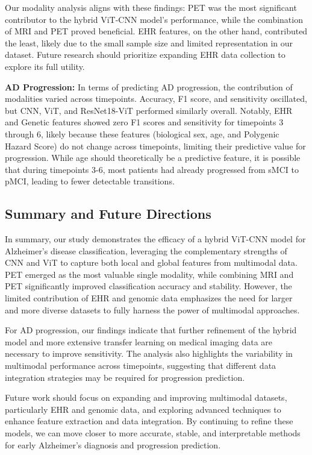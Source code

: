 Our modality analysis aligns with these findings: PET was the most significant contributor to the hybrid ViT-CNN model’s performance, while the combination of MRI and PET proved beneficial. EHR features, on the other hand, contributed the least, likely due to the small sample size and limited representation in our dataset. Future research should prioritize expanding EHR data collection to explore its full utility.

\textbf{AD Progression:} In terms of predicting AD progression, the contribution of modalities varied across timepoints. Accuracy, F1 score, and sensitivity oscillated, but CNN, ViT, and ResNet18-ViT performed similarly overall. Notably, EHR and Genetic features showed zero F1 scores and sensitivity for timepoints 3 through 6, likely because these features (biological sex, age, and Polygenic Hazard Score) do not change across timepoints, limiting their predictive value for progression. While age should theoretically be a predictive feature, it is possible that during timepoints 3-6, most patients had already progressed from sMCI to pMCI, leading to fewer detectable transitions.

\subsection{Summary and Future Directions}

In summary, our study demonstrates the efficacy of a hybrid ViT-CNN model for Alzheimer’s disease classification, leveraging the complementary strengths of CNN and ViT to capture both local and global features from multimodal data. PET emerged as the most valuable single modality, while combining MRI and PET significantly improved classification accuracy and stability. However, the limited contribution of EHR and genomic data emphasizes the need for larger and more diverse datasets to fully harness the power of multimodal approaches.

For AD progression, our findings indicate that further refinement of the hybrid model and more extensive transfer learning on medical imaging data are necessary to improve sensitivity. The analysis also highlights the variability in multimodal performance across timepoints, suggesting that different data integration strategies may be required for progression prediction.

Future work should focus on expanding and improving multimodal datasets, particularly EHR and genomic data, and exploring advanced techniques to enhance feature extraction and data integration. By continuing to refine these models, we can move closer to more accurate, stable, and interpretable methods for early Alzheimer’s diagnosis and progression prediction.